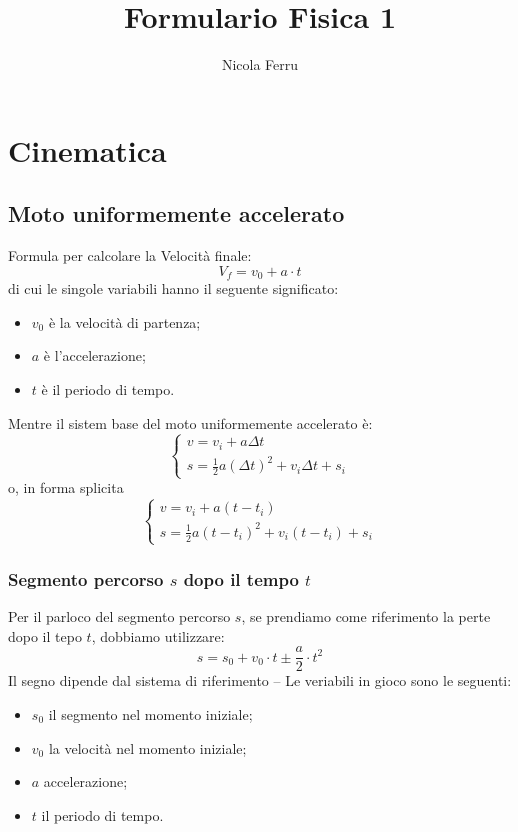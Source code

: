 \documentclass{book}
\title{Formulario Fisica 1}
\author{Nicola Ferru}
\begin{document}
\maketitle
\tableofcontents

\chapter{Cinematica}
\label{sec:cin}

\section{Moto uniformemente accelerato}
\label{sec:motouniacc}

Formula per calcolare la Velocità finale:
\begin{equation}
  \label{eq:vf}
  V_f=v_0+a\cdot t
\end{equation}
di cui le singole variabili hanno il seguente significato:
\begin{itemize}
\item $v_0$ è la velocità di partenza;
\item $a$ è l'accelerazione;
\item $t$ è il periodo di tempo.
\end{itemize}
Mentre il sistem base del moto uniformemente accelerato è:
\begin{equation}
  \label{eq:motouniaccformbase}
  \begin{cases}
    v=v_i+a\Delta t\\
    s=\frac{1}{2}a(\Delta t)^2+v_i\Delta t+s_i
  \end{cases}
\end{equation}
o, in forma splicita
\begin{equation}
  \label{eq:motouniaccformbase2}
  \begin{cases}
    v=v_i+a(t-t_i)\\
    s=\frac{1}{2}a(t-t_i)^2+v_i(t-t_i)+s_i
  \end{cases}
\end{equation}
\subsection{Segmento percorso $s$ dopo il tempo $t$}
\label{sec:segPDTempt}
Per il parloco del segmento percorso $s$, se prendiamo come riferimento la perte dopo il tepo $t$, dobbiamo utilizzare:
\begin{equation}
  \label{eq:segperdopot}
  s=s_0+v_0\cdot t \pm \frac{a}{2}\cdot t^2
\end{equation}
Il segno dipende dal sistema di riferimento -- Le veriabili in gioco sono le seguenti:
\begin{itemize}
\item $s_0$ il segmento nel momento iniziale;
\item $v_0$ la velocità nel momento iniziale;
\item $a$ accelerazione;
\item $t$ il periodo di tempo.
\end{itemize}
\end{document}

